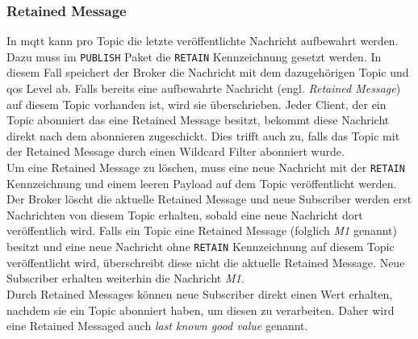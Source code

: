 \subsubsection{Retained Message} \label{s:retained-messages}
In \ac{mqtt} kann pro Topic die letzte veröffentlichte Nachricht aufbewahrt werden.
Dazu muss im \verb|PUBLISH| Paket die \verb|RETAIN| Kennzeichnung gesetzt werden.
In diesem Fall speichert der Broker die Nachricht mit dem dazugehörigen Topic und \ac{qos} Level ab.
Falls bereits eine aufbewahrte Nachricht (engl. \textit{Retained Message}) auf diesem Topic vorhanden ist, wird sie überschrieben.
Jeder Client, der ein Topic abonniert das eine Retained Message besitzt, bekommt diese Nachricht direkt nach dem abonnieren zugeschickt.
Dies trifft auch zu, falls das Topic mit der Retained Message durch einen Wildcard Filter abonniert wurde.
\cite{teamRetainedMessagesMQTT}
\\
Um eine Retained Message zu löschen, muss eine neue Nachricht mit der \verb|RETAIN| Kennzeichnung und einem leeren Payload auf dem Topic veröffentlicht werden. Der Broker löscht die aktuelle Retained Message und neue Subscriber werden erst Nachrichten von diesem Topic erhalten, sobald eine neue Nachricht dort veröffentlich wird.
Falls ein Topic eine Retained Message (folglich \textit{M1} genannt) besitzt und eine neue Nachricht ohne \verb|RETAIN| Kennzeichnung auf diesem Topic veröffentlicht wird, überschreibt diese nicht die aktuelle Retained Message. Neue Subscriber erhalten weiterhin die Nachricht \textit{M1}.
\cite{mqtt5Specification}
\\
Durch Retained Messages können neue Subscriber direkt einen Wert erhalten, nachdem sie ein Topic abonniert haben, um diesen zu verarbeiten. Daher wird eine Retained Messaged auch \textit{last known good value} genannt.
\cite{teamRetainedMessagesMQTT}

